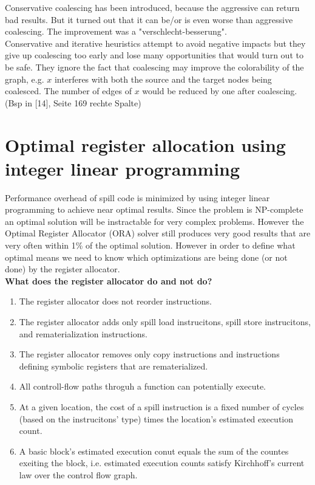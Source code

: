 \documentclass[a4paper,10pt]{article}
\begin{document}
Conservative coalescing has been introduced, because the aggressive can return bad results. But it turned out that it can be/or is even worse than aggressive coalescing. The improvement was a "verschlecht-besserung".\\
Conservative and iterative heuristics attempt to avoid negative impacts but they give up coalescing too early and lose many opportunities that would turn out to be safe. They ignore the fact that coalescing may improve the colorability of the graph, e.g. $x$ interferes with both the source and the target nodes being coalesced. The number of edges of $x$ would be reduced by one after coalescing. (Bsp in [14], Seite 169 rechte Spalte)

\section{Optimal register allocation using integer linear programming}
Performance overhead of spill code is minimized by using integer linear programming to achieve near optimal results. Since the problem is
NP-complete an optimal solution will be instractable for very complex problems. However the Optimal Register Allocator (ORA) solver still
produces very good results that are very often within 1\% of the optimal solution. However in order to define what optimal means we need
to know which optimizations are being done (or not done) by the register allocator.\\

\noindent \textbf{What does the register allocator do and not do?}
\begin{enumerate}
 \item The register allocator does not reorder instructions.
 \item The register allocator adds only spill load instrucitons, spill store instrucitons, and rematerialization instructions.
 \item The register allocator removes only copy instructions and instructions defining symbolic registers that are rematerialized.
 \item All controll-flow paths throguh a function can potentially execute.
 \item At a given location, the cost of a spill instruction is a fixed number of cycles (based on the instrucitons' type) times the
       location's estimated execution count.
 \item A basic block's estimated execution conut equals the sum of the countes exeiting the block, i.e. estimated execution counts
       satisfy Kirchhoff's current law over the control flow graph.
\end{enumerate}
\end{document}
